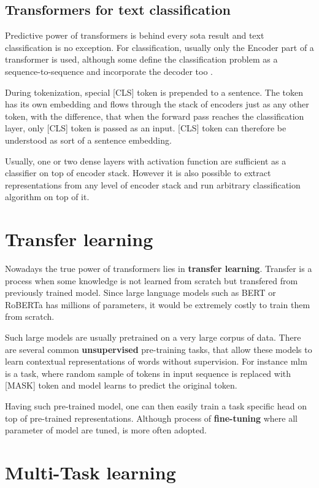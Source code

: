 \subsection{Transformers for text classification}
Predictive power of transformers is behind every \gls{sota} result and text classification is no exception. For classification, usually only the Encoder part of a transformer is used, although some define the classification problem as a sequence-to-sequence and incorporate the decoder too \cite{raffel2019exploring}.

During tokenization, special [CLS] token is prepended to a sentence. The token has its own embedding and flows through the stack of encoders just as any other token, with the difference, that when the forward pass reaches the classification layer, only [CLS] token is passed as an input. [CLS] token can therefore be understood as sort of a sentence embedding.

Usually, one or two dense layers with activation function are sufficient as a classifier on top of encoder stack. However it is also possible to extract representations from any level of encoder stack and run arbitrary classification algorithm on top of it.




\section{Transfer learning}
Nowadays the true power of transformers lies in \textbf{transfer learning}. Transfer is a process when some knowledge is not learned from scratch but transfered from previously trained model. Since large language models such as BERT or RoBERTa has millions of parameters, it would be extremely costly to train them from scratch. 

Such large models are usually pretrained on a very large corpus of data. There are several common \textbf{unsupervised} pre-training tasks, that allow these models to learn contextual representations of words without supervision. For instance \gls{mlm} is a task, where random sample of tokens in input sequence is replaced with [MASK] token and model learns to predict the original token.

Having such pre-trained model, one can then easily train a task specific head on top of pre-trained representations. Although process of \textbf{fine-tuning} where all parameter of model are tuned, is more often adopted.

\section{Multi-Task learning}
